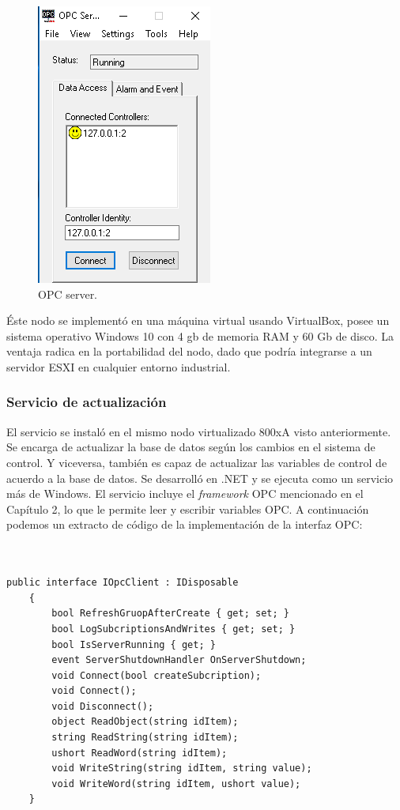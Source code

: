 \begin{figure}[htpb]
	\centering
	\includegraphics[scale=.5]{./Figures/c2.png}
	\caption{OPC server\protect\footnotemark.}
	\label{fig:c2}
\end{figure}

Éste nodo se implementó en una máquina virtual usando VirtualBox, posee un sistema operativo Windows 10 con 4 gb de memoria RAM y 60 Gb de disco. La ventaja radica en la portabilidad del nodo, dado que podría integrarse a un servidor ESXI en cualquier entorno industrial. 

\subsubsection{Servicio de actualización}

El servicio se instaló en el mismo nodo virtualizado 800xA visto anteriormente. Se encarga de actualizar la base de datos según los cambios en el sistema de control. Y viceversa, también es capaz de actualizar las variables de control de acuerdo a la base de datos. Se desarrolló en .NET y se ejecuta  como un servicio más de Windows. El servicio incluye el \textit{framework} OPC mencionado en el Capítulo 2, lo que le permite leer y escribir variables OPC. A continuación podemos un extracto de código de la implementación de la interfaz OPC:
\begin{lstlisting}[label=cod:vControl,caption=Implementación de la interfaz OPC]  % Start your code-block


public interface IOpcClient : IDisposable
    {
        bool RefreshGruopAfterCreate { get; set; }
        bool LogSubcriptionsAndWrites { get; set; }
        bool IsServerRunning { get; }
        event ServerShutdownHandler OnServerShutdown;
        void Connect(bool createSubcription);
        void Connect();
        void Disconnect();
        object ReadObject(string idItem);
        string ReadString(string idItem);
        ushort ReadWord(string idItem);      
        void WriteString(string idItem, string value);
        void WriteWord(string idItem, ushort value);
    }
\end{lstlisting}

